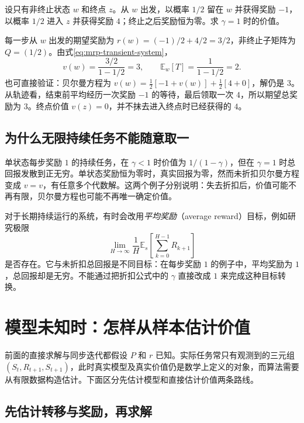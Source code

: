 \documentclass[UTF8,12pt,a4paper,fontset=fandol]{ctexart}
\begin{document}
\begin{example}[反复等待后结束的未折扣任务]
\label{ex:mrp-terminal}
设只有非终止状态 $w$ 和终点 $z$。从 $w$ 出发，以概率 $1/2$ 留在 $w$ 并获得奖励 $-1$，以概率 $1/2$ 进入 $z$ 并获得奖励 $4$；终止之后奖励恒为零。求 $\gamma=1$ 时的价值。
\end{example}

\begin{solve}
每一步从 $w$ 出发的期望奖励为 $r(w)=(-1)/2+4/2=3/2$，非终止子矩阵为 $Q=(1/2)$。由式\eqref{eq:mrp-transient-system}，
\[
  v(w)=\frac{3/2}{1-1/2}=3,\qquad \mathbb E_w[T]=\frac{1}{1-1/2}=2.
\]
也可直接验证：贝尔曼方程为 $v(w)=\tfrac12[-1+v(w)]+\tfrac12[4+0]$，解仍是 $3$。从轨迹看，结束前平均经历一次奖励 $-1$ 的等待，最后领取一次 $4$，所以期望总奖励为 $3$。终点价值 $v(z)=0$，并不抹去进入终点时已经获得的 $4$。
\end{solve}

\subsection{为什么无限持续任务不能随意取一}

单状态每步奖励 $1$ 的持续任务，在 $\gamma<1$ 时价值为 $1/(1-\gamma)$，但在 $\gamma=1$ 时总回报发散到正无穷。单状态奖励恒为零时，真实回报为零，然而未折扣贝尔曼方程变成 $v=v$，有任意多个代数解。这两个例子分别说明：失去折扣后，价值可能不再有限，贝尔曼方程也可能不再唯一确定价值。

对于长期持续运行的系统，有时会改用\emph{平均奖励}（average reward）目标，例如研究极限
\[
  \lim_{H\to\infty}\frac1H
  \mathbb E_s\!\left[\sum_{k=0}^{H-1}R_{k+1}\right]
\]
是否存在。它与未折扣总回报是不同目标：在每步奖励 $1$ 的例子中，平均奖励为 $1$，总回报却是无穷。不能通过把折扣公式中的 $\gamma$ 直接改成 $1$ 来完成这种目标转换。

\section{模型未知时：怎样从样本估计价值}
\label{sec:mrp-learning}

前面的直接求解与同步迭代都假设 $P$ 和 $r$ 已知。实际任务常只有观测到的三元组 $(S_t,R_{t+1},S_{t+1})$，此时真实模型及真实价值仍是数学上定义的对象，而算法需要从有限数据构造估计。下面区分先估计模型和直接估计价值两条路线。

\subsection{先估计转移与奖励，再求解}
\end{document}
